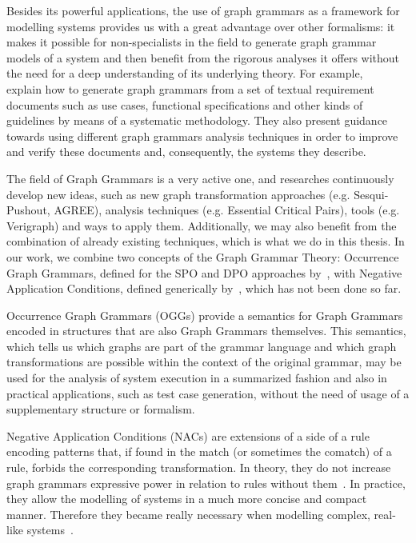 Besides its powerful applications, the use of graph grammars as a framework for modelling systems provides us with a great advantage over other formalisms: it makes it possible for non-specialists in the field to generate graph grammar models of a system and then benefit from the rigorous analyses it offers without the need for a deep understanding of its underlying theory. For example, ~\cite{Junior2015,BezerraWEIT2016,Cota2017} explain how to generate graph grammars from a set of textual requirement documents such as use cases, functional specifications and other kinds of guidelines by means of a systematic methodology. They also present guidance towards using different graph grammars analysis techniques in order to improve and verify these documents and, consequently, the systems they describe.

The field of Graph Grammars is a very active one, and researches continuously develop new ideas, such as new graph transformation approaches (e.g. Sesqui-Pushout, AGREE), analysis techniques (e.g. Essential Critical Pairs), tools (e.g. Verigraph) and ways to apply them.
Additionally, we may also benefit from the combination of already existing techniques, which is what we do in this thesis.
In our work, we combine two concepts of the Graph Grammar Theory: Occurrence Graph Grammars, defined for the SPO and DPO approaches by~\cite{Ribeiro1996, Corradini1996}, with Negative Application Conditions, defined generically by~\cite{Habel1996}, which has not been done so far.

Occurrence Graph Grammars (OGGs) provide a semantics for Graph Grammars encoded in structures that are also Graph Grammars themselves. 
This semantics, which tells us which graphs are part of the grammar language and which graph transformations are possible within the context of the original grammar, may be used for the analysis of system execution in a summarized fashion and also in practical applications, such as test case generation, without the need of usage of a supplementary structure or formalism.

Negative Application Conditions (NACs) are extensions of a side of a rule encoding patterns that, if found in the match (or sometimes the comatch) of a rule, forbids the corresponding transformation. In theory, they do not increase graph grammars expressive power in relation to rules without them~\cite{Habel1996}. In practice, they allow the modelling of systems in a much more concise and compact manner. Therefore they became really necessary when modelling complex, real-like systems~\cite{Corradini2013, Corradini2014}.

